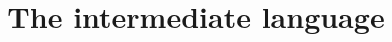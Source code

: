 \documentclass[12pt, a4paper]{article}
\title{The \ailtau{} intermediate language}
\author{}
\date{}
\begin{document}

\nocite{*} 

\maketitle

\ottall
\end{document}

